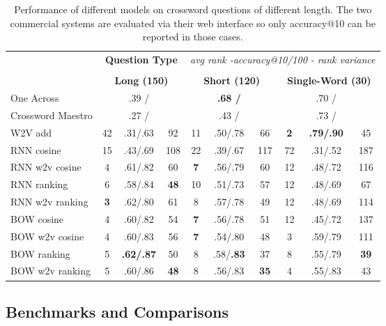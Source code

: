 \begin{table*}[ht]
{\small
\hfill{}
\begin{tabular}{l|ccc|ccc|ccc|}
\multicolumn{1}{c}{} & \multicolumn{3}{c}{{\bf Question Type }}& \multicolumn{6}{|c|}{\emph{avg rank -accuracy@10/100 - rank variance} } \\
\multicolumn{10}{c}{} \\
\multicolumn{1}{c}{\textbf{}}&\multicolumn{3}{|c|}{\textbf{Long (150)}}& \multicolumn{3}{|c|}{\textbf{Short (120)}} & \multicolumn{3}{|c|}{\textbf{Single-Word (30)}}  \\
\hline
One Across & & .39 / && & \bf .68 / &&& .70 / &  \\
Crossword Maestro& & .27 /&& & .43 /&&& .73 / & \\
\hdashline
W2V add & 42  & .31/.63 & 92  & 11 & .50/.78 & 66 & \bf 2 & \bf .79/.90 & 45  \\
\hdashline
RNN cosine	& 15 &  .43/.69 & 108 & 22 & .39/.67 & 117 & 72 & .31/.52 & 187 \\
RNN w2v cosine &	4 & .61/.82 & 60 & \bf 7 & .56/.79 & 60 & 12 & .48/.72 & 116 \\
RNN ranking 	& 6 & .58/.84 & \bf 48 & 10 & .51/.73 & 57 & 12 & .48/.69 & 67 \\
RNN w2v ranking &	\bf 3 & .62/.80 & 61 & 8 & .57/.78 & 49 & 12 & .48/.69 & 114 \\
BOW cosine & 4 & .60/.82 & 54 & \bf 7 & .56/.78 & 51 & 12 & .45/.72 & 137 \\
BOW w2v cosine & 4 & .60/.83 & 56 & \bf 7  & .54/.80 & 48 & 3 & .59/.79 & 111 \\
BOW ranking	& 5 & \bf .62/.87 & 50 & 8 & .58/\bf .83 & 37 & 8 & .55/.79 & \bf 39 \\
BOW w2v ranking & 5 & .60/.86 & \bf 48 & 8 & .56/.83 & \bf 35 & 4 & .55/.83 & 43 \\
\end{tabular}}
\hfill{}
\caption{Performance of different models on crossword questions of different length. The two commercial systems are evaluated via their web interface so only accuracy@10 can be reported in those cases. }
\label{results2}
\label{tb:tablename}
\end{table*}

\subsection{Benchmarks and Comparisons}

